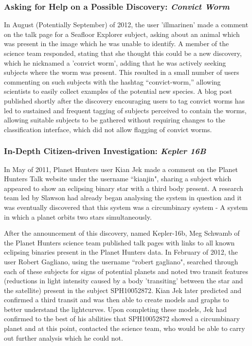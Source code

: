 \documentclass{sigchi}
\begin{document}
\subsubsection{Asking for Help on a Possible Discovery: \emph{Convict Worm}}
In August (Potentially September) of 2012, the user 'illmarinen' made a comment on the talk page for a Seafloor Explorer subject, asking about an animal which was present in the image which he was unable to identify. A member of the science team responded, stating that she thought this could be a new discovery, which he nicknamed a 'convict worm', adding that he was actively seeking subjects where the worm was present. This resulted in a small number of users commenting on such subjects with the hashtag “convict-worm,” allowing scientists to easily collect examples of the potential new species. A blog post published shortly after the discovery encouraging users to tag convict worms has led to sustained and frequent tagging of subjects perceived to contain the worms, allowing suitable subjects to be gathered without requiring changes to the classification interface, which did not allow flagging of convict worms.

\subsubsection{In-Depth Citizen-driven Investigation: \emph{Kepler 16B}}
In May of 2011, Planet Hunters user Kian Jek made a comment on the Planet Hunters Talk website under the username ``kianjin", sharing a subject which appeared to show an eclipsing binary star with a third body present. A research team led by Slawson had already began analysing the system in question and it was eventually discovered that this system was a circumbinary system - A system in which a planet orbits two stars simultaneously. 

After the announcement of this discovery, named Kepler-16b, Meg Schwamb of the Planet Hunters science team published talk pages with links to all known eclipsing binaries present in the Planet Hunters data. In February of 2012, the user Robert Gagliano, using the username ``robert gagliano", searched through each of these subjects for signs of potential planets and noted two transit features (reductions in light intensity caused by a body 'transiting' between the star and the satellite) present in the subject SPH10052872. Kian Jek later predicted and confirmed a third transit and was then able to create models and graphs to better understand the lightcurves. Upon completing these models, Jek had confirmed to the best of his abilities that SPH10052872 showed a circumbinary planet and at this point, contacted the science team, who would be able to carry out further analysis which he could not. 
\end{document}

